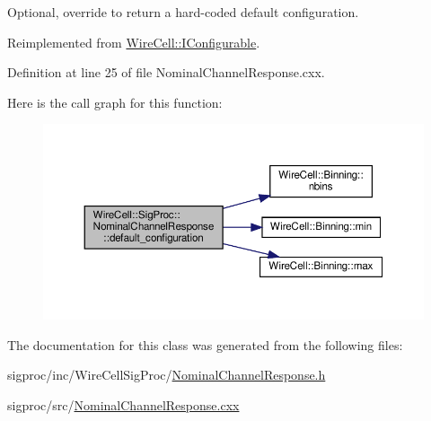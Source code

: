 Optional, override to return a hard-\/coded default configuration. 



Reimplemented from \hyperlink{class_wire_cell_1_1_i_configurable_a54841b2da3d1ea02189478bff96f7998}{Wire\+Cell\+::\+I\+Configurable}.



Definition at line 25 of file Nominal\+Channel\+Response.\+cxx.

Here is the call graph for this function\+:
\nopagebreak
\begin{figure}[H]
\begin{center}
\leavevmode
\includegraphics[width=350pt]{class_wire_cell_1_1_sig_proc_1_1_nominal_channel_response_a897752df4a2a548028aa1051a0b5b372_cgraph}
\end{center}
\end{figure}


The documentation for this class was generated from the following files\+:\begin{DoxyCompactItemize}
\item 
sigproc/inc/\+Wire\+Cell\+Sig\+Proc/\hyperlink{_nominal_channel_response_8h}{Nominal\+Channel\+Response.\+h}\item 
sigproc/src/\hyperlink{_nominal_channel_response_8cxx}{Nominal\+Channel\+Response.\+cxx}\end{DoxyCompactItemize}
